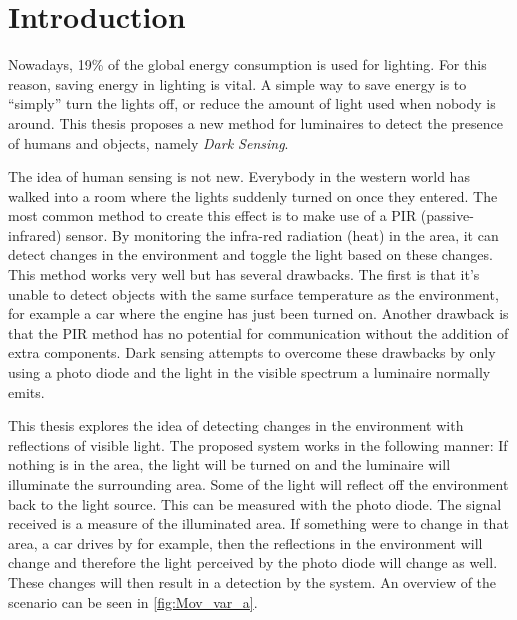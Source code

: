 \chapter{Introduction}
\label{chp:introduction}
Nowadays, 19\% of the global energy consumption is used for lighting. For this reason, saving energy in lighting is vital. A simple way to save energy is to “simply” turn the lights off, or reduce the amount of light used when nobody is around. This thesis proposes a new method for luminaires to detect the presence of humans and objects, namely \textit{Dark Sensing}.

The idea of human sensing is not new. Everybody in the western world has walked into a room where the lights suddenly turned on once they entered. The most common method to create this effect is to make use of a PIR (passive-infrared) sensor. By monitoring the infra-red radiation (heat) in the area, it can detect changes in the environment and toggle the light based on these changes. This method works very well but has several drawbacks. The first is that it's unable to detect objects with the same surface temperature as the environment, for example a car where the engine has just been turned on. Another drawback is that the PIR method has no potential for communication without the addition of extra components. Dark sensing attempts to overcome these drawbacks by only using a photo diode and the light in the visible spectrum a luminaire normally emits.

This thesis explores the idea of detecting changes in the environment with reflections of visible light. The proposed system works in the following manner: If nothing is in the area, the light will be turned on and the luminaire will illuminate the surrounding area. Some of the light will reflect off the environment back to the light source. This can be measured with the photo diode. The signal received is a measure of the illuminated area. If something were to change in that area, a car drives by for example, then the reflections in the environment will change and therefore the light perceived by the photo diode will change as well. These changes will then result in a detection by the system. An overview of the scenario can be seen in \ref{fig:Mov_var_a}.

